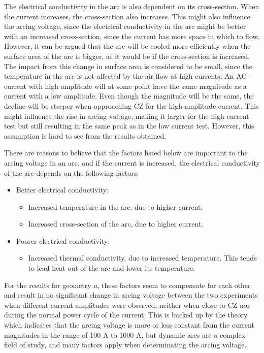 \documentclass[10pt,a4paper,twoside]{article}
\begin{document}
The electrical conductivity in the arc is also dependent on its cross-section. When the current increases, the cross-section also increases. This might also influence the arcing voltage, since the electrical conductivity in the arc might be better with an increased cross-section, since the current has more space in which to flow. However, it can be argued that the arc will be cooled more efficiently when the surface area of the arc is bigger, as it would be if the cross-section is increased. The impact from this change in surface area is considered to be small, since the temperature in the arc is not affected by the air flow at high currents. An AC-current with high amplitude will at some point have the same magnitude as a current with a low amplitude. Even though the magnitude will be the same, the decline will be steeper when approaching CZ for the high amplitude current. This might influence the rise in arcing voltage, making it larger for the high current test but still resulting in the same peak as in the low current test. However, this assumption is hard to see from the results obtained.

There are reasons to believe that the factors listed below are important to the arcing voltage in an arc, and if the current is increased, the electrical conductivity of the arc depends on the following factors:
\begin{itemize}
\item[] Better electrical conductivity:
	\begin{itemize}
		\item Increased temperature in the arc, due to higher current.
		\item Increased cross-section of the arc, due to higher current.
	\end{itemize}
\item[] Poorer electrical conductivity:
	\begin{itemize}
		\item Increased thermal conductivity, due to increased temperature. This tends to lead heat out of the arc and lower its temperature.
	\end{itemize}		 
\end{itemize} 

For the results for geometry \textit{a}, these factors seem to compensate for each other and result in no significant change in arcing voltage between the two experiments when different current amplitudes were observed, neither when close to CZ nor during the normal power cycle of the current. This is backed up by the theory which indicates that the arcing voltage is more or less constant from the current magnitudes in the range of 100 A to 1000 A, but dynamic arcs are a complex field of study, and many factors apply when determinating the arcing voltage.
\end{document}

